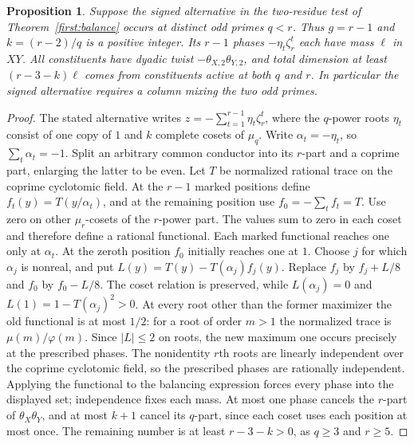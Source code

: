 \documentclass[11pt,a4paper]{article}
\numberwithin{equation}{section}
\newtheorem{proposition}[theorem]{Proposition}
\theoremstyle{remark}
\begin{document}
\begin{proposition}\label{found:S:5.1}\label{found:S:key:prop:four-profile}
Suppose the signed alternative in the two-residue test of Theorem~\ref{first:balance} occurs at distinct odd primes $q<r$.
Thus $g=r-1$ and $k=(r-2)/q$ is a positive integer. Its $r-1$ phases
$-\eta_t\zeta_r^t$ each have mass $\ell$ in $XY$.
All constituents have dyadic twist $-\theta_{X,2}\theta_{Y,2}$, and
total dimension at least $(r-3-k)\ell$ comes from constituents active
at both $q$ and $r$. In particular the signed alternative requires a
column mixing the two odd primes.
\end{proposition}
\begin{proof}
The stated alternative writes $z=-\sum_{t=1}^{r-1}\eta_t\zeta_r^t$,
where the $q$-power roots $\eta_t$ consist of one copy of $1$ and $k$
complete cosets of $\mu_q$. Write $\alpha_t=-\eta_t$, so
$\sum_t\alpha_t=-1$. Split an arbitrary common conductor into its
$r$-part and a coprime part, enlarging the latter to be even.
Let $T$ be normalized rational trace on the coprime cyclotomic field.
At the $r-1$ marked positions define $f_t(y)=T(y/\alpha_t)$,
and at the remaining position use $f_0=-\sum_t f_t=T$.
Use zero on other $\mu_r$-cosets of the $r$-power part. The values
sum to zero in each coset and therefore define a rational functional.
Each marked functional reaches one
only at $\alpha_t$. At the zeroth position $f_0$ initially reaches
one at $1$. Choose $j$ for which $\alpha_j$ is nonreal, and put
$L(y)=T(y)-T(\alpha_j)f_j(y)$.
Replace $f_j$ by $f_j+L/8$ and $f_0$ by $f_0-L/8$.
The coset relation is preserved, while $L(\alpha_j)=0$ and
$L(1)=1-T(\alpha_j)^2>0$. At every root other than the former
maximizer the old functional is at most $1/2$:
for a root of order $m>1$ the normalized trace is $\mu(m)/\varphi(m)$.
Since $|L|\le2$ on roots, the new maximum one occurs precisely at
the prescribed phases. The nonidentity $r$th roots are linearly
independent over the coprime cyclotomic field, so the prescribed
phases are rationally independent. Applying the functional to the
balancing expression forces every phase into the displayed set;
independence fixes each mass. At most one phase cancels the $r$-part of
$\theta_X\theta_Y$, and at most $k+1$ cancel its $q$-part, since each
coset uses each position at most once. The remaining number is at least
$r-3-k>0$, as $q\ge3$ and $r\ge5$.
\end{proof}
\end{document}
